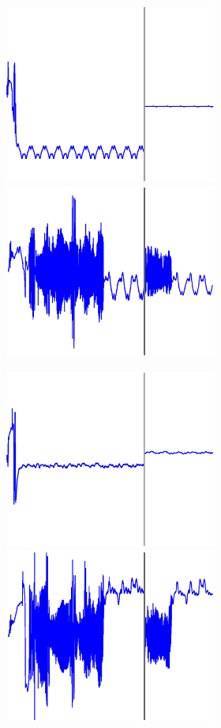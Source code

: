 \begin{figure}
\begin{subfigure}{\textwidth}
\begin{subfigure}{\textwidth}
        \end{subfigure}
        
        
        \textbf{}\begin{subfigure}{\textwidth}
        \centering
        
        \includegraphics[height=0.1\linewidth,width=.45\linewidth]{Figures/Fig_T4/MATLAB/ST_T3_Theta1.eps}
        \includegraphics[trim=2cm 1cm 2cm 1cm, clip=true,height=0.1\linewidth,width=.45\linewidth]{Figures/Fig_T4/Python/ST_T3_Theta1.eps}
        
        \end{subfigure}
        
        
        \textbf{}\begin{subfigure}{\textwidth}
        \centering
        
        \includegraphics[height=0.1\linewidth,width=.45\linewidth]{Figures/Fig_T4/MATLAB/ST_T3_Theta2.eps}
        \includegraphics[trim=2cm 1cm 2cm 1cm, clip=true,height=0.1\linewidth,width=.45\linewidth]{Figures/Fig_T4/Python/ST_T3_Theta2.eps}
        
        \end{subfigure}
        
        
        \textbf{}\begin{subfigure}{\textwidth}
        \centering
        

\end{subfigure}
\end{subfigure}
\end{figure}
